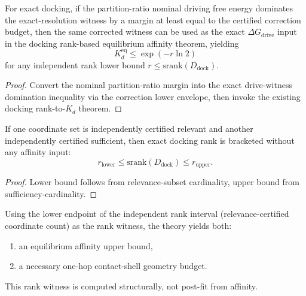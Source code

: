 \begin{theorem}\label{thm:md-rank-kd-bound-from-partition-chain}
For exact docking, if the partition-ratio nominal driving free energy dominates the exact-resolution witness by a margin at least equal to the certified correction budget, then the same corrected witness can be used as the exact $\Delta G_{\mathrm{drive}}$ input in the docking rank-based equilibrium affinity theorem, yielding
\[
K_d^{\mathrm{eq}} \le \exp(-r\ln 2)
\]
for any independent rank lower bound \(r \le \mathrm{srank}(D_{\mathrm{dock}})\).
\end{theorem}

\begin{proof}
Convert the nominal partition-ratio margin into the exact drive-witness domination inequality via the correction lower envelope, then invoke the existing docking rank-to-$K_d$ theorem.
\end{proof}

\begin{theorem}\label{thm:md-independent-srank-interval-certificates}
If one coordinate set is independently certified relevant and another independently certified sufficient, then exact docking rank is bracketed without any affinity input:
\[
r_{\mathrm{lower}} \le \mathrm{srank}(D_{\mathrm{dock}}) \le r_{\mathrm{upper}}.
\]
\end{theorem}

\begin{proof}
Lower bound follows from relevance-subset cardinality, upper bound from sufficiency-cardinality.
\end{proof}

\begin{theorem}\label{thm:md-independent-certificate-risky-prediction-bundle}
Using the lower endpoint of the independent rank interval (relevance-certified coordinate count) as the rank witness, the theory yields both:
\begin{enumerate}
\item an equilibrium affinity upper bound,
\item a necessary one-hop contact-shell geometry budget.
\end{enumerate}
This rank witness is computed structurally, not post-fit from affinity.
\end{theorem}

